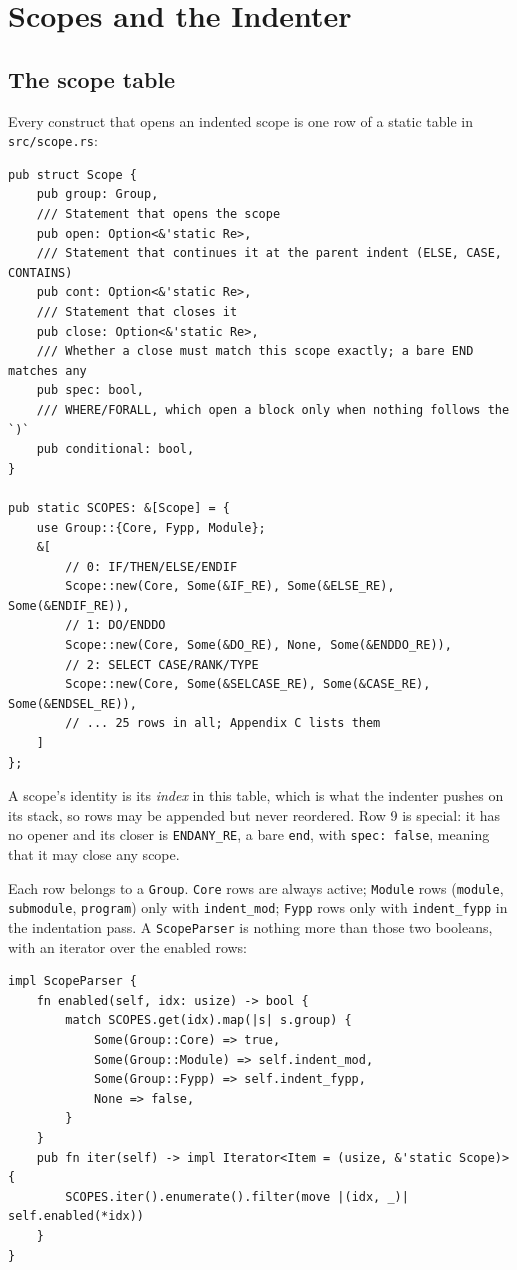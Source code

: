 \documentclass[11pt,a4paper,openany]{book}
\newcommand{\code}[1]{\texttt{\small #1}}
\newcommand{\file}[1]{\texttt{\small\color{accent}#1}}
\begin{document}
\chapter{Scopes and the Indenter}\label{ch:indenter}

\section{The scope table}

Every construct that opens an indented scope is one row of a static table in
\file{src/scope.rs}:

\begin{lstlisting}[style=rust]
pub struct Scope {
    pub group: Group,
    /// Statement that opens the scope
    pub open: Option<&'static Re>,
    /// Statement that continues it at the parent indent (ELSE, CASE, CONTAINS)
    pub cont: Option<&'static Re>,
    /// Statement that closes it
    pub close: Option<&'static Re>,
    /// Whether a close must match this scope exactly; a bare END matches any
    pub spec: bool,
    /// WHERE/FORALL, which open a block only when nothing follows the `)`
    pub conditional: bool,
}

pub static SCOPES: &[Scope] = {
    use Group::{Core, Fypp, Module};
    &[
        // 0: IF/THEN/ELSE/ENDIF
        Scope::new(Core, Some(&IF_RE), Some(&ELSE_RE), Some(&ENDIF_RE)),
        // 1: DO/ENDDO
        Scope::new(Core, Some(&DO_RE), None, Some(&ENDDO_RE)),
        // 2: SELECT CASE/RANK/TYPE
        Scope::new(Core, Some(&SELCASE_RE), Some(&CASE_RE), Some(&ENDSEL_RE)),
        // ... 25 rows in all; Appendix C lists them
    ]
};
\end{lstlisting}

A scope's identity is its \emph{index} in this table, which is what the
indenter pushes on its stack, so rows may be appended but never reordered.
Row 9 is special: it has no opener and its closer is \code{ENDANY\_RE}, a bare
\code{end}, with \code{spec: false}, meaning that it may close any scope.

Each row belongs to a \code{Group}. \code{Core} rows are always active;
\code{Module} rows (\code{module}, \code{submodule}, \code{program}) only with
\code{indent\_mod}; \code{Fypp} rows only with \code{indent\_fypp} in the
indentation pass. A \code{ScopeParser} is nothing more than those two
booleans, with an iterator over the enabled rows:

\begin{lstlisting}[style=rust]
impl ScopeParser {
    fn enabled(self, idx: usize) -> bool {
        match SCOPES.get(idx).map(|s| s.group) {
            Some(Group::Core) => true,
            Some(Group::Module) => self.indent_mod,
            Some(Group::Fypp) => self.indent_fypp,
            None => false,
        }
    }
    pub fn iter(self) -> impl Iterator<Item = (usize, &'static Scope)> {
        SCOPES.iter().enumerate().filter(move |(idx, _)| self.enabled(*idx))
    }
}
\end{lstlisting}
\end{document}
